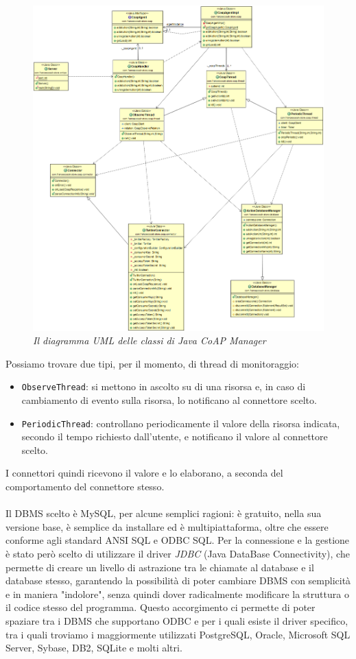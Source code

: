 \begin{figure}[hp]
\centering
\includegraphics[width=\textwidth]{immagini/uml.png}
\caption{\textit{Il diagramma UML delle classi di Java CoAP Manager}}
\end{figure}
\vspace{1.00cm}
Possiamo trovare due tipi, per il momento, di thread di monitoraggio:
\begin{itemize}
\item {\tt ObserveThread}: si mettono in ascolto su di una risorsa e, in caso di cambiamento di evento sulla risorsa, lo notificano al connettore scelto.
\item {\tt PeriodicThread}: controllano periodicamente il valore della risorsa indicata, secondo il tempo richiesto dall'utente, e notificano il valore al connettore scelto.
\end{itemize}
I connettori quindi ricevono il valore e lo elaborano, a seconda del comportamento del connettore stesso.
\\\\Il DBMS scelto è MySQL, per alcune semplici ragioni: è gratuito, nella sua versione base, è semplice da installare ed è multipiattaforma, oltre che essere conforme agli standard ANSI SQL e ODBC SQL. Per la connessione e la gestione è stato però scelto di utilizzare il driver \textit{JDBC} (Java DataBase Connectivity), che permette di creare un livello di astrazione tra le chiamate al database e il database stesso, garantendo la possibilità di poter cambiare DBMS con semplicità e in maniera "indolore", senza quindi dover radicalmente modificare la struttura o il codice stesso del programma. Questo accorgimento ci permette di poter spaziare tra i DBMS che supportano ODBC e per i quali esiste il driver specifico, tra i quali troviamo i maggiormente utilizzati PostgreSQL, Oracle, Microsoft SQL Server, Sybase, DB2, SQLite e molti altri.
